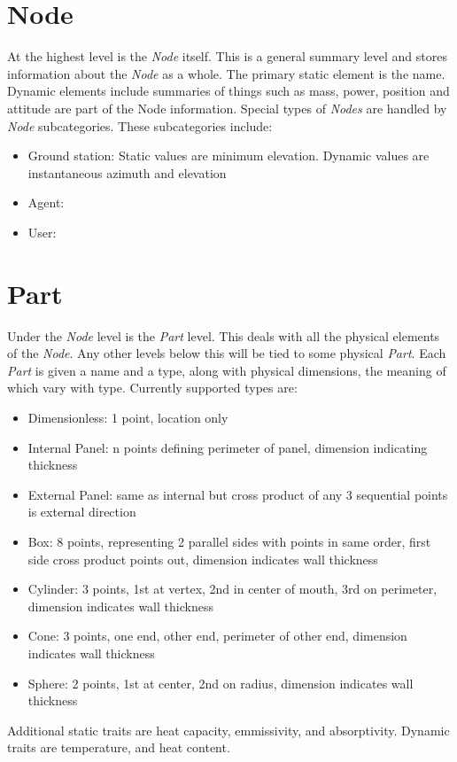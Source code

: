 \documentclass[10pt,letterpaper]{report}
\begin{document}
\section{Node}
At the highest level is the \textit{Node} itself. This is a general summary level and stores information about the \textit{Node} as a whole. The primary static element is the name. Dynamic elements include summaries of things such as mass, power, position and attitude are part of the Node information. Special types of \textit{Nodes} are handled by \textit{Node} subcategories. These subcategories include:
\begin{itemize}
\item Ground station: Static values are minimum elevation. Dynamic values are instantaneous azimuth and elevation
\item Agent:
\item User:
\end{itemize}
\section{Part}
Under the \textit{Node} level is the \textit{Part} level. This deals with all the physical elements of the \textit{Node}. Any other levels below this will be tied to some physical \textit{Part}. Each \textit{Part} is given a name and a type, along with physical dimensions, the meaning of which vary with type. Currently supported types are:
\begin{itemize}
\item Dimensionless: 1 point, location only
\item Internal Panel: n points defining perimeter of panel, dimension indicating thickness
\item External Panel: same as internal but cross product of any 3 sequential points is external direction
\item Box: 8 points, representing 2 parallel sides with points in same order, first side cross product points out, dimension indicates wall thickness
\item Cylinder: 3 points, 1st at vertex, 2nd in center of mouth, 3rd on perimeter, dimension indicates wall thickness 
\item Cone: 3 points, one end, other end, perimeter of other end, dimension indicates wall thickness
\item Sphere: 2 points, 1st at center, 2nd on radius, dimension indicates wall thickness
\end{itemize}
Additional static traits are heat capacity, emmissivity, and absorptivity. Dynamic traits are temperature, and heat content.
\end{document}

